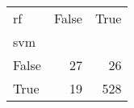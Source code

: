 \begin{tabular}{lrr}
\toprule
rf &  False &  True  \\
svm   &        &        \\
\midrule
False &     27 &     26 \\
True  &     19 &    528 \\
\bottomrule
\end{tabular}

